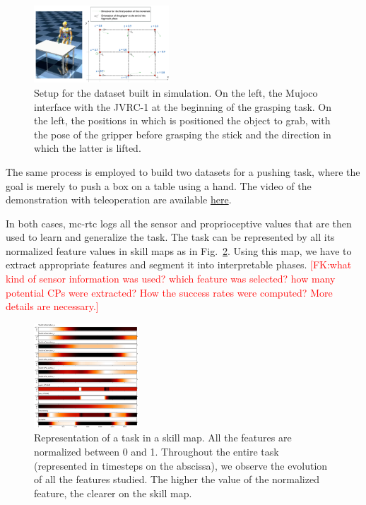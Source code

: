 \documentclass[conference]{IEEEtran}
\newcommand{\fk}[1]{\textcolor{red}{[FK:#1]}}
\begin{document}
\begin{figure}[t]
  \centering
  \includegraphics[width=0.45\textwidth]{img/simSetup5.png}
  \caption{Setup for the dataset built in simulation. On the left, the Mujoco interface with the JVRC-1 \cite{jvrc} at the beginning of the grasping task. On the left, the positions in which is positioned the object to grab, with the pose of the gripper before grasping the stick and the direction in which the latter is lifted.}
  \label{fig:simSetup}
\end{figure}

 The same process is employed to build two datasets for a pushing task, where the goal is merely to push a box on a table using a hand. The video of the demonstration with teleoperation are available \href{https://github.com/VictorBbt/Article_TaskGeneralization}{here}.

 In both cases, mc-rtc logs all the sensor and proprioceptive values that are then used to learn and generalize the task. The task can be represented by all its normalized feature values in skill maps as in Fig.~\ref{fig:skillmap}. Using this map, we have to extract appropriate features and segment it into interpretable phases. %
\fk{what kind of sensor information was used? which feature was selected? how many potential CPs were extracted? How the success rates were computed? More details are necessary.}

 \begin{figure}[t]
  \centering
  \includegraphics[width=0.35\textwidth]{img/skillMap.png}
  \caption{Representation of a task in a skill map. All the features are normalized between 0 and 1. Throughout the entire task (represented in timesteps on the abscissa), we observe the evolution of all the features studied. The higher the value of the normalized feature, the clearer on the skill map.}
  \label{fig:skillmap}
\end{figure}
\end{document}
